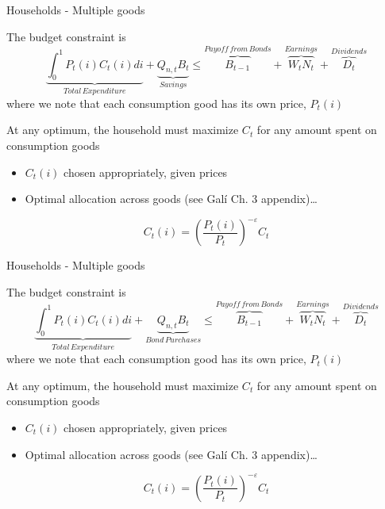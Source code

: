 \documentclass{beamer}
\begin{document}

	
\begin{frame}{Households - Multiple goods}

The budget constraint is
\begin{equation*}
\underbrace{\int_{0}^{1} P_{t}(i) C_{t}(i)di}_{Total \, Expenditure} + \underbrace{Q_{n,t} B_{t}}_{Savings} \leq \overbrace{B_{t-1}}^{Payoff\, from\, Bonds} + \overbrace{W_{t} N_{t}}^{Earnings} + \overbrace{D_{t}}^{Dividends}
\end{equation*}
where we note that each consumption good has its own price, $P_{t}(i)$

\vspace{3mm}
At any optimum, the household must maximize $C_{t}$ for any amount spent on consumption goods
\begin{itemize}
\item	$C_{t}(i)$ chosen appropriately, given prices
\item	Optimal allocation across goods (see Gal\'i Ch. 3 appendix)\ldots
\end{itemize}
\begin{equation*}
C_{t}(i) = \left( \frac{P_{t}(i)}{P_{t}} \right)^{-\varepsilon} C_{t} \label{eqn:ds_optimal_cons}
\end{equation*}

\end{frame}


	
\begin{frame}{Households - Multiple goods}

The budget constraint is
\begin{equation*}
\underbrace{\int_{0}^{1} P_{t}(i) C_{t}(i)di}_{Total \, Expenditure} + \underbrace{Q_{n,t} B_{t}}_{Bond\,Purchases} \leq \overbrace{B_{t-1}}^{Payoff\, from\, Bonds} + \overbrace{W_{t} N_{t}}^{Earnings} + \overbrace{D_{t}}^{Dividends}
\end{equation*}
where we note that each consumption good has its own price, $P_{t}(i)$

\vspace{3mm}
At any optimum, the household must maximize $C_{t}$ for any amount spent on consumption goods
\begin{itemize}
\item	$C_{t}(i)$ chosen appropriately, given prices
\item	Optimal allocation across goods (see Gal\'i Ch. 3 appendix)\ldots
\end{itemize}
\begin{equation*}
C_{t}(i) = \left( \frac{P_{t}(i)}{P_{t}} \right)^{-\varepsilon} C_{t} \label{eqn:ds_optimal_cons}
\end{equation*}

\end{frame}
\end{document}
